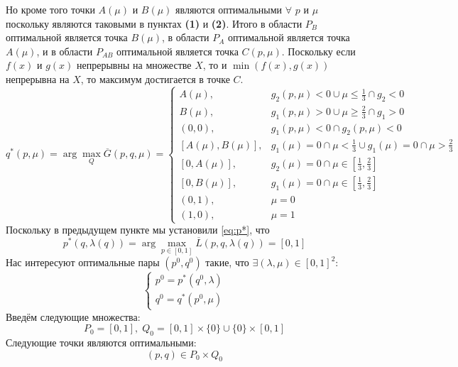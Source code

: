 Но кроме того точки $A(\mu)$ и $B(\mu)$ являются оптимальными 
$\forall$ $p$ и $\mu$ поскольку являются таковыми в 
пунктах \textbf{(1)} и \textbf{(2)}. 
Итого в области $P_B$ оптимальной является точка $B(\mu)$,
в области $P_A$ оптимальной является точка $A(\mu)$,
и в области $P_{AB}$ оптимальной является точка $C(p, \mu)$.
Поскольку если $f(x)$ и $g(x)$ непрерывны на множестве $X$, то и 
$\min(f(x), g(x))$ непрерывна на $X$, то максимум достигается в точке $C$.
$$
	q^*(p,\mu)= \arg \max \limits_Q \overline{G}(p,q,\mu) =
	\begin{cases}
		A(\mu), & 
		g_2(p,\mu)<0 \cup \mu \leqslant \frac{1}{3} \cap g_2 < 0 
		\\
		B(\mu), & 
		g_1(p,\mu)>0 \cup \mu \geqslant \frac{2}{3} \cap g_1 > 0 
		\\
		(0,0),  & 
		g_1(p,\mu)<0 \cap g_2(p,\mu)<0 
		\\
		[A(\mu), B(\mu)], & 
		g_1(\mu)=0 \cap \mu < \frac{1}{3} \cup
		g_1(\mu)=0 \cap \mu > \frac{2}{3} 
		\\
		[0, A(\mu)], & 
		g_2(\mu)=0 \cap \mu \in [\frac{1}{3},\frac{2}{3}]
		\\
		[0, B(\mu)], & 
		g_1(\mu)=0 \cap \mu \in [\frac{1}{3},\frac{2}{3}] 
		\\
		(0,1), & 
		\mu = 0 
		\\
		(1,0), & 
		\mu = 1
	\end{cases}	
$$		
Поскольку в предыдущем пункте мы установили \eqref{eq:p*}, что 
$$
	p^*(q,\lambda(q))=\arg \max \limits_{p \in [0,1]}
	\overline{L}(p, q, \lambda(q))=[0,1]
$$
Нас интересуют оптимальные пары $(p^0,q^0)$ такие, что 
$\exists (\lambda, \mu) \in [0,1]^2 $:
$$
	\begin{cases}
		p^0=p^*(q^0,\lambda) \\
		q^0=q^*(p^0,\mu)
	\end{cases}
$$
Введём следующие множества:
$$
	P_0=[0,1], \; Q_0=[0,1] \times \{0\} \cup \{0\} \times [0,1]
$$
Следующие точки являются оптимальными:
$$(p, q) \in P_0 \times Q_0$$